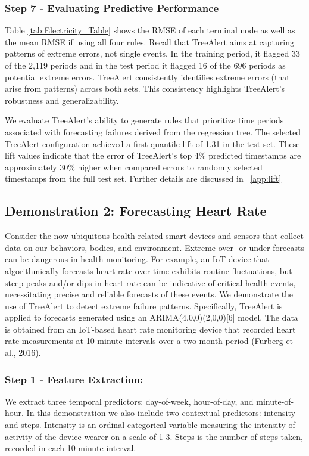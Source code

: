 \documentclass[preprint,12pt]{elsarticle}
\begin{document}
\subsubsection*{Step 7 - Evaluating Predictive Performance}
Table \ref{tab:Electricity_Table} shows the RMSE of each terminal node as well as the mean RMSE if using all four rules. Recall that TreeAlert aims at capturing patterns of extreme errors, not single events. In the training period, it flagged 33 of the 2,119 periods and in the test period it flagged 16 of the 696 periods as potential extreme errors. TreeAlert consistently identifies extreme errors (that arise from patterns) across both sets. This consistency highlights TreeAlert's robustness and generalizability.

We evaluate TreeAlert’s ability to generate rules that prioritize time periods associated with forecasting failures derived from the regression tree. The selected TreeAlert configuration achieved a first-quantile lift of 1.31 in the test set. These lift values indicate that the error of TreeAlert’s top 4\% predicted timestamps are approximately 30\% higher  when compared errors to randomly selected timestamps from the full test set. Further details are discussed in ~\ref{app:lift}

\subsection{Demonstration 2: Forecasting Heart Rate}

Consider the now ubiquitous health-related smart devices and sensors that collect data on our behaviors, bodies, and environment. Extreme over- or under-forecasts can be dangerous in health monitoring. For example, an IoT device that algorithmically forecasts heart-rate over time exhibits routine fluctuations, but steep peaks and/or dips in heart rate can be indicative of critical health events, necessitating precise and reliable forecasts of these events. We demonstrate the use of TreeAlert to detect extreme failure patterns. Specifically, TreeAlert is applied to forecasts  generated using an ARIMA(4,0,0)(2,0,0)[6] model.  The data is obtained from an IoT-based heart rate monitoring device that recorded heart rate measurements at 10-minute intervals over a two-month period (Furberg et al., 2016). 

\subsubsection*{Step 1 - Feature Extraction:}
We extract three temporal predictors: day-of-week, hour-of-day, and minute-of-hour. In this demonstration we also include two contextual predictors: intensity and steps. Intensity is an ordinal categorical variable measuring the intensity of activity of the device wearer on a scale of 1-3. Steps is the number of steps taken, recorded in each 10-minute interval.
\end{document}
